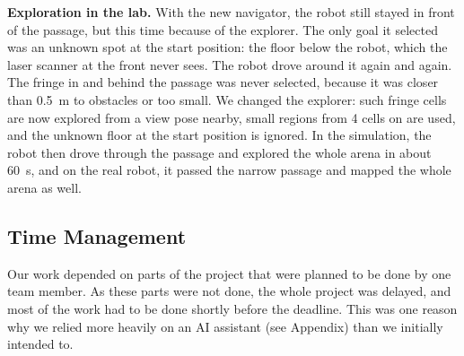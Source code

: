 \documentclass[../report.tex]{subfiles}
\begin{document}
    \textbf{Exploration in the lab.}
    With the new navigator, the robot still stayed in front of the passage, but this time because of the explorer.
    The only goal it selected was an unknown spot at the start position: the floor below the robot, which the laser scanner at the front never sees. The robot drove around it again and again.
    The fringe in and behind the passage was never selected, because it was closer than \SI{0.5}{m} to obstacles or too small.
    We changed the explorer: such fringe cells are now explored from a view pose nearby, small regions from 4 cells on are used, and the unknown floor at the start position is ignored.
    In the simulation, the robot then drove through the passage and explored the whole arena in about \SI{60}{s}, and on the real robot, it passed the narrow passage and mapped the whole arena as well.

    \subsection{Time Management}
    \label{sec:challenges:time_management}


    Our work depended on parts of the project that were planned to be done by one team member.
    As these parts were not done, the whole project was delayed, and most of the work had to be done shortly before the deadline.
    This was one reason why we relied more heavily on an AI assistant (see Appendix) than we initially intended to.
\end{document}
